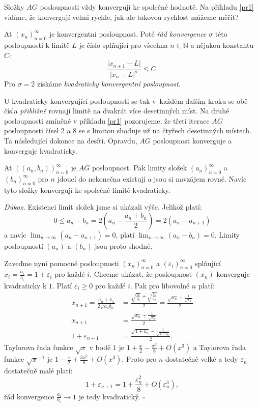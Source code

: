 \documentclass[12pt]{report}
\begin{document}
Složky $AG$ posloupnosti vždy konvergují ke společné hodnotě. Na příkladu \ref{pr1} vidíme, že konvergují velmi rychle, jak ale takovou rychlost můžeme měřit?
\begin{definice}
Ať $(x_n)_{n=0}^{\infty}$ je konvergentní posloupnost. Poté \textit{řád konvergence} $\sigma$ této posloupnosti k limitě $L$ je číslo splňující pro všechna $n \in \mathbb{N}$ a nějakou konstantu $C$:
$$\frac{\vert x_{n+1} - L \vert}{\vert x_n - L \vert ^ \sigma} \leqslant C.$$
Pro $\sigma = 2$ získáme \textit{kvadraticky konvergentní posloupnost}. 
\end{definice}

U kvadraticky konvergující posloupnosti se tak v~každém dalším kroku se obě čísla \textit{přibližně} rovnají limitě na dvakrát více desetinných míst. Na druhé posloupnosti zmíněné v příkladu \ref{pr1} pozorujeme, že třetí iterace $AG$ posloupnosti čísel $2$ a $8$ se s limitou shoduje už na čtyřech desetinných místech. Ta následující dokonce na desíti. Opravdu, $AG$ posloupnost konverguje a konverguje kvadraticky.

\begin{veta}\label{conv}
Ať $((a_n,b_n))_{n=0} ^{\infty}$ je $AG$ posloupnost. Pak limity složek $(a_n)_{n=0}^{\infty}$ a $(b_n)_{n=0}^{\infty}$ pro $n$ jdoucí do nekonečna existují a jsou si navzájem rovné. Navíc tyto složky konvergují ke společné limitě kvadraticky.
\end{veta}


\noindent \textit{Důkaz.} Existenci limit složek jsme si ukázali výše. Jelikož platí:
$$ 0 \leqslant a_n - b_n  =  2 \left( a_n - \frac{a_n+ b_n}{2} \right) = 2 ( a_{n} - a_{n+1} )$$
a navíc $\lim_{n \rightarrow \infty} (a_n - a_{n+1}) = 0$, platí $\lim_{n \rightarrow \infty} (a_n - b_n) = 0$. Limity posloupností $(a_n)$ a $(b_n)$ jsou proto shodné.

Zaveďme nyní pomocné posloupnosti $(x_n)_{n=0}^{\infty}$ a $(\varepsilon_i)_{n=0}^{\infty}$ splňující $x_i = \frac{a_i}{b_i} = 1 + \varepsilon_i$ pro každé $i$. Chceme ukázat, že posloupnost $(x_n)$ konverguje kvadraticky k $1$. Platí $\varepsilon_i \geqslant 0$ pro každé $i$. Pak pro libovolné $n$ platí:
\begin{align*}
x_{n+1} = \frac{a_n+b_n}{2 \sqrt{a_n b_n}} &= \frac{\sqrt{\frac{a_n}{b_n}} + \sqrt{\frac{b_n}{a_n}}}{2} = \frac{\sqrt{x_n}+\frac{1}{\sqrt{x_n}}}{2}\\
x_{n+1} &=\frac{\sqrt{x_n}+\frac{1}{\sqrt{x_n}}}{2}\\
1+\varepsilon_{n+1}  &= \frac{\sqrt{1+\varepsilon_n} + \frac{1}{\sqrt{1+\varepsilon_n}}}{2}.
\end{align*}
Taylorova řada funkce $\sqrt{x}$ v bodě $1$ je $1+\frac{x}{2} - \frac{x^2}{8} + O(x^3)$ a Taylorova řada funkce $\sqrt{x}^{-1}$ je $1-\frac{x}{2}+\frac{3 x^2}{8} + O(x^3)$. Proto pro $n$ dostatečně velké a tedy $\varepsilon_n$ dostatečně malé platí:
$$1+\varepsilon_{n+1}  = 1+\frac{\varepsilon_n ^2}{8} + O(\varepsilon_n ^3),$$ 
řád konvergence $\frac{a_i}{b_i} \rightarrow 1$ je tedy kvadratický. \hfill $\square$\\
\end{document}
